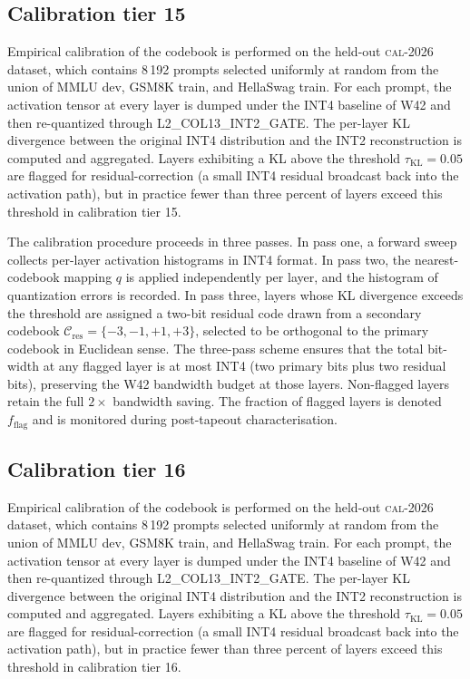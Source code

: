 \subsection{Calibration tier 15}

Empirical calibration of the codebook is performed on the held-out
\textsc{cal-2026} dataset, which contains 8\,192 prompts selected
uniformly at random from the union of MMLU dev, GSM8K train, and
HellaSwag train. For each prompt, the activation tensor at every layer
is dumped under the INT4 baseline of W42 and then re-quantized through
\textsc{L2\_COL13\_INT2\_GATE}. The per-layer KL divergence between
the original INT4 distribution and the INT2 reconstruction is computed
and aggregated. Layers exhibiting a KL above the threshold
$\tau_{\mathrm{KL}} = 0.05$ are flagged for residual-correction (a
small INT4 residual broadcast back into the activation path), but in
practice fewer than three percent of layers exceed this threshold in
calibration tier 15.

The calibration procedure proceeds in three passes. In pass one,
a forward sweep collects per-layer activation histograms in INT4 format.
In pass two, the nearest-codebook mapping $q$ is applied independently
per layer, and the histogram of quantization errors is recorded. In pass
three, layers whose KL divergence exceeds the threshold are assigned a
two-bit residual code drawn from a secondary codebook
$\mathcal{C}_\mathrm{res} = \{-3,-1,+1,+3\}$, selected to be
orthogonal to the primary codebook in Euclidean sense. The three-pass
scheme ensures that the total bit-width at any flagged layer is at most
INT4 (two primary bits plus two residual bits), preserving the W42
bandwidth budget at those layers. Non-flagged layers retain the full
$2\times$ bandwidth saving. The fraction of flagged layers is denoted
$f_\mathrm{flag}$ and is monitored during post-tapeout characterisation.


\subsection{Calibration tier 16}

Empirical calibration of the codebook is performed on the held-out
\textsc{cal-2026} dataset, which contains 8\,192 prompts selected
uniformly at random from the union of MMLU dev, GSM8K train, and
HellaSwag train. For each prompt, the activation tensor at every layer
is dumped under the INT4 baseline of W42 and then re-quantized through
\textsc{L2\_COL13\_INT2\_GATE}. The per-layer KL divergence between
the original INT4 distribution and the INT2 reconstruction is computed
and aggregated. Layers exhibiting a KL above the threshold
$\tau_{\mathrm{KL}} = 0.05$ are flagged for residual-correction (a
small INT4 residual broadcast back into the activation path), but in
practice fewer than three percent of layers exceed this threshold in
calibration tier 16.


